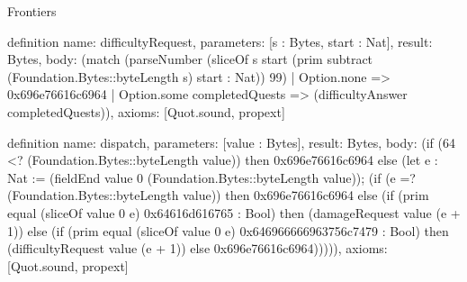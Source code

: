 \begin{lexlean}{Frontiers}
\begin{semanticmodule}
definition{
  name: difficultyRequest,
  parameters: [s : Bytes, start : Nat],
  result: Bytes,
  body: (match (parseNumber (sliceOf s start (prim subtract (Foundation.Bytes::byteLength s) start : Nat)) 99)
    | Option.none => 0x696e76616c6964
    | Option.some completedQuests => (difficultyAnswer completedQuests)),
  axioms: [Quot.sound, propext]
}

definition{
  name: dispatch,
  parameters: [value : Bytes],
  result: Bytes,
  body: (if (64 <? (Foundation.Bytes::byteLength value)) then 0x696e76616c6964 else (let e : Nat := (fieldEnd value 0 (Foundation.Bytes::byteLength value)); (if (e =? (Foundation.Bytes::byteLength value)) then 0x696e76616c6964 else (if (prim equal (sliceOf value 0 e) 0x64616d616765 : Bool) then (damageRequest value (e + 1)) else (if (prim equal (sliceOf value 0 e) 0x646966666963756c7479 : Bool) then (difficultyRequest value (e + 1)) else 0x696e76616c6964))))),
  axioms: [Quot.sound, propext]
}


\end{semanticmodule}
\end{lexlean}

